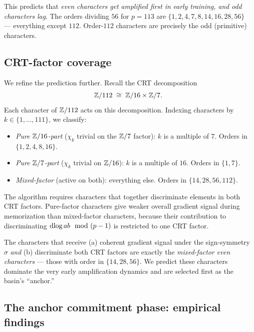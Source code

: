 This predicts that \emph{even characters get amplified first in early
training, and odd characters lag}.  The orders dividing $56$ for $p = 113$ are
$\{1, 2, 4, 7, 8, 14, 16, 28, 56\}$ --- everything except $112$.  Order-$112$
characters are precisely the odd (primitive) characters.

\subsection{CRT-factor coverage}
\label{subsec:bgeo-crt}

We refine the prediction further.  Recall the CRT decomposition
\begin{equation}
  \mathbb{Z}/112 \;\cong\; \mathbb{Z}/16 \times \mathbb{Z}/7.
\end{equation}
Each character of $\mathbb{Z}/112$ acts on this decomposition.  Indexing characters
by $k \in \{1, \ldots, 111\}$, we classify:
\begin{itemize}[leftmargin=*]
  \item \emph{Pure $\mathbb{Z}/16$-part} ($\chi_k$ trivial on the $\mathbb{Z}/7$ factor):
        $k$ is a multiple of $7$.  Orders in $\{1, 2, 4, 8, 16\}$.
  \item \emph{Pure $\mathbb{Z}/7$-part} ($\chi_k$ trivial on $\mathbb{Z}/16$): $k$ is a
        multiple of $16$.  Orders in $\{1, 7\}$.
  \item \emph{Mixed-factor} (active on both): everything else.  Orders in
        $\{14, 28, 56, 112\}$.
\end{itemize}

The algorithm requires characters that together discriminate elements in
both CRT factors.  Pure-factor characters give weaker overall gradient
signal during memorization than mixed-factor characters, because their
contribution to discriminating $\operatorname{dlog} ab \mod (p-1)$ is restricted to one
CRT factor.

\begin{remark}
\label{rem:bgeo-anchor-prediction}
The characters that receive (a) coherent gradient signal under the
sign-symmetry $\sigma$ \emph{and} (b) discriminate both CRT factors are
exactly the \emph{mixed-factor even characters} --- those with order in
$\{14, 28, 56\}$.  We predict these characters dominate the very early
amplification dynamics and are selected first as the basin's ``anchor.''
\end{remark}

\subsection{The anchor commitment phase: empirical findings}
\label{subsec:bgeo-anchor}


